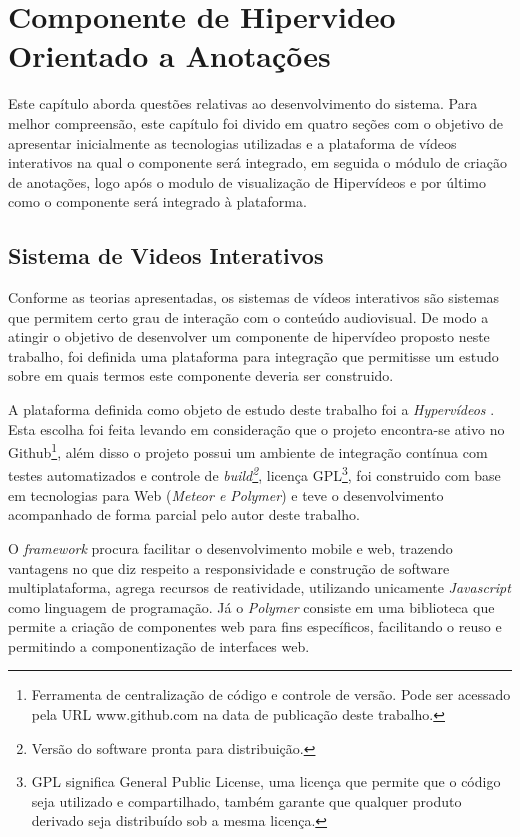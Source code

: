 \chapter[Componente de Hipervideo Orientado a Anotações]{Componente de Hipervideo Orientado a Anotações}

Este capítulo aborda questões relativas ao desenvolvimento do sistema. Para melhor compreensão, este capítulo foi divido em quatro seções com o objetivo de apresentar inicialmente as tecnologias utilizadas e a plataforma de vídeos interativos na qual o componente será integrado, em seguida o módulo de criação de anotações, logo após o modulo de visualização de Hipervídeos e por último como o componente será integrado à plataforma.

\section{Sistema de Videos Interativos}

Conforme as teorias apresentadas, os sistemas de vídeos interativos são sistemas que permitem certo grau de interação com o conteúdo audiovisual. De modo a atingir o objetivo de desenvolver um componente de hipervídeo proposto neste trabalho, foi definida uma plataforma para integração que permitisse um estudo sobre em quais termos este componente deveria ser construido.

A plataforma definida como objeto de estudo deste trabalho foi a \textit{Hypervídeos} \cite{arthurtcc}. Esta escolha foi feita levando em consideração que o projeto encontra-se ativo no Github\footnote{Ferramenta de centralização de código e controle de versão. Pode ser acessado pela URL www.github.com na data de publicação deste trabalho.}, além disso o projeto possui um ambiente de integração contínua com testes automatizados e controle de \textit{build\footnote{Versão do software pronta para distribuição.}}, licença GPL\footnote{GPL significa General Public License, uma licença que permite que o código seja utilizado e compartilhado, também garante que qualquer produto derivado seja distribuído sob a mesma licença.}, foi construido com base em tecnologias para Web (\textit{Meteor e Polymer}) e teve o desenvolvimento acompanhado de forma parcial pelo autor deste trabalho.

O \textit{framework} procura facilitar o desenvolvimento mobile e web, trazendo vantagens no que diz respeito a responsividade e construção de software multiplataforma, agrega recursos de reatividade, utilizando unicamente \textit{Javascript} como linguagem de programação. Já o \textit{Polymer} consiste em uma biblioteca que permite a criação de componentes web para fins específicos, facilitando o reuso e permitindo a componentização de interfaces web.

